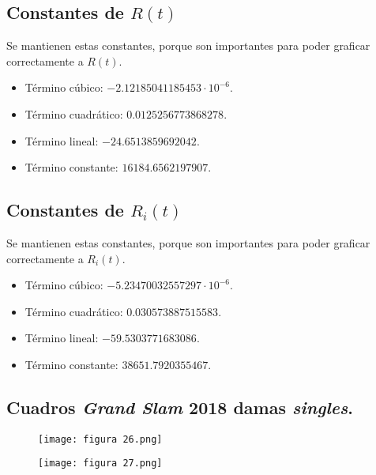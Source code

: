 \documentclass[a4paper]{article}
\begin{document}
\subsection{Constantes de $R(t)$}
Se mantienen estas constantes, porque son importantes para poder graficar correctamente a $R(t)$. 
\begin{itemize}
    \item Término cúbico: $-2.12185041185453\cdot 10^{-6}$.
    \item Término cuadrático: $0.0125256773868278$.
    \item Término lineal: $ - 24.6513859692042$.
    \item Término constante: $16184.6562197907$.
\end{itemize}
\subsection{Constantes de $R_{i}(t)$}
Se mantienen estas constantes, porque son importantes para poder graficar correctamente a $R_{i}(t)$. 
\begin{itemize}
    \item Término cúbico: $-5.23470032557297\cdot 10^{-6}$.
    \item Término cuadrático: $0.030573887515583$.
    \item Término lineal: $ - 59.5303771683086$.
    \item Término constante: $38651.7920355467$.
\end{itemize}



\subsection{Cuadros \textit{Grand Slam} 2018 damas \textit{singles}.}
\begin{figure}[H]
    \begin{center}
    \texttt{[image: figura 26.png]}    
    \end{center}    
\end{figure} 
\begin{figure}[H]
    \begin{center}
    \texttt{[image: figura 27.png]}    
    \end{center}    
\end{figure} 
\end{document}
